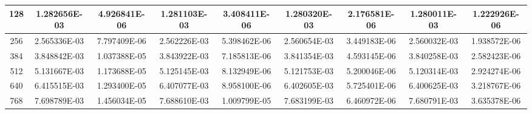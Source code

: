 {\begin{tabular}{|c|c|c|c|c|c|c|c|c|}
    128 & 1.282656E-03 & 4.926841E-06 & 1.281103E-03 & 3.408411E-06 & 1.280320E-03 & 2.176581E-06 & 1.280011E-03 & 1.222926E-06 \\ \hline
    256 & 2.565336E-03 & 7.797409E-06 & 2.562226E-03 & 5.398462E-06 & 2.560654E-03 & 3.449183E-06 & 2.560032E-03 & 1.938572E-06 \\ \hline
    384 & 3.848842E-03 & 1.037388E-05 & 3.843922E-03 & 7.185813E-06 & 3.841354E-03 & 4.593145E-06 & 3.840258E-03 & 2.582423E-06 \\ \hline
    512 & 5.131667E-03 & 1.173688E-05 & 5.125145E-03 & 8.132949E-06 & 5.121753E-03 & 5.200046E-06 & 5.120314E-03 & 2.924274E-06 \\ \hline
    640 & 6.415515E-03 & 1.293400E-05 & 6.407077E-03 & 8.958100E-06 & 6.402605E-03 & 5.725401E-06 & 6.400625E-03 & 3.218767E-06 \\ \hline
    768 & 7.698789E-03 & 1.456034E-05 & 7.688610E-03 & 1.009799E-05 & 7.683199E-03 & 6.460972E-06 & 7.680791E-03 & 3.635378E-06 \\ \hline
\end{tabular}
}

\phantom{-}

